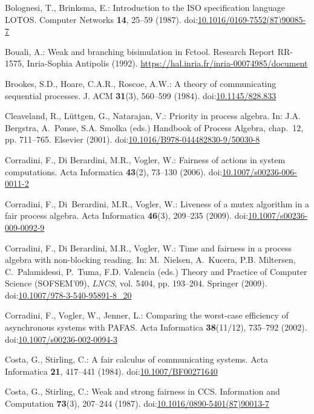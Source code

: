 \documentclass[smallcondensed]{svjour3}
\providecommand{\urlalt}[2]{\href{#1}{#2}}
\providecommand{\doi}[1]{doi:\urlalt{http://dx.doi.org/#1}{#1}}
\begin{document}
\begin{thebibliography}{10}
Bolognesi, T., Brinksma, E.: Introduction to the {ISO} specification language
  {LOTOS}.
\newblock Computer Networks \textbf{14}, 25--59 (1987).
\newblock \doi{10.1016/0169-7552(87)90085-7}

Bouali, A.: Weak and branching bisimulation in {Fctool}.
\newblock Research Report RR-1575, Inria-Sophia Antipolis (1992).
\newblock \urlprefix\url{https://hal.inria.fr/inria-00074985/document}

Brookes, S.D., Hoare, C.A.R., Roscoe, A.W.: A theory of communicating
  sequential processes.
\newblock J. ACM \textbf{31}(3), 560--599 (1984).
\newblock \doi{10.1145/828.833}

Cleaveland, R., L{\"u}ttgen, G., Natarajan, V.: Priority in process algebra.
\newblock In: J.A. Bergstra, A.~Ponse, S.A. Smolka (eds.) Handbook of Process
  Algebra, chap.~12, pp. 711--765. Elsevier (2001).
\newblock \doi{10.1016/B978-044482830-9/50030-8}

Corradini, F., {Di Berardini}, M.R., Vogler, W.: Fairness of actions in system
  computations.
\newblock Acta Informatica \textbf{43}(2), 73--130 (2006).
\newblock \doi{10.1007/s00236-006-0011-2}

Corradini, F., Di~Berardini, M.R., Vogler, W.: Liveness of a mutex algorithm in
  a fair process algebra.
\newblock Acta Informatica \textbf{46}(3), 209--235 (2009).
\newblock \doi{10.1007/s00236-009-0092-9}

Corradini, F., {Di Berardini}, M.R., Vogler, W.: Time and fairness in a process
  algebra with non-blocking reading.
\newblock In: M.~Nielsen, A.~Kucera, P.B. Miltersen, C.~Palamidessi, P.~Tuma,
  F.D. Valencia (eds.) Theory and Practice of Computer Science ({SOFSEM}'09),
  \emph{\rm LNCS}, vol. 5404, pp. 193--204. Springer (2009).
\newblock \doi{10.1007/978-3-540-95891-8\_20}

Corradini, F., Vogler, W., Jenner, L.: Comparing the worst-case efficiency of
  asynchronous systems with {PAFAS}.
\newblock Acta Informatica \textbf{38}(11/12), 735--792 (2002).
\newblock \doi{10.1007/s00236-002-0094-3}

Costa, G., Stirling, C.: A fair calculus of communicating systems.
\newblock Acta Informatica \textbf{21}, 417--441 (1984).
\newblock \doi{10.1007/BF00271640}

Costa, G., Stirling, C.: Weak and strong fairness in {CCS}.
\newblock Information and Computation \textbf{73}(3), 207--244 (1987).
\newblock \doi{10.1016/0890-5401(87)90013-7}


\end{thebibliography}
\end{document}

